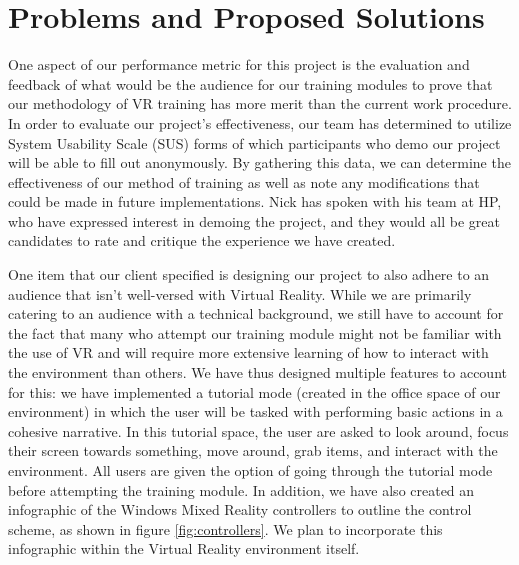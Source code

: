 \documentclass[onecolumn, draftclsnofoot,10pt, compsoc]{IEEEtran}
\begin{document}
\section{Problems and Proposed Solutions}
One aspect of our performance metric for this project is the evaluation and feedback of what would be the audience for our training modules to prove that our methodology of VR training has more merit than the current work procedure. In order to evaluate our project’s effectiveness, our team has determined to utilize System Usability Scale (SUS) forms of which participants who demo our project will be able to fill out anonymously. By gathering this data, we can determine the effectiveness of our method of training as well as note any modifications that could be made in future implementations. Nick has spoken with his team at HP, who have expressed interest in demoing the project, and they would all be great candidates to rate and critique the experience we have created. 


One item that our client specified is designing our project to also adhere to an audience that isn’t well-versed with Virtual Reality. While we are primarily catering to an audience with a technical background, we still have to account for the fact that many who attempt our training module might not be familiar with the use of VR and will require more extensive learning of how to interact with the environment than others. We have thus designed multiple features to account for this: we have implemented a tutorial mode (created in the office space of our environment) in which the user will be tasked with performing basic actions in a cohesive narrative. In this tutorial space, the user are asked to look around, focus their screen towards something, move around, grab items, and interact with the environment. All users are given the option of going through the tutorial mode before attempting the training module. In addition, we have also created an infographic of the Windows Mixed Reality controllers to outline the control scheme, as shown in figure \ref{fig:controllers}. We plan to incorporate this infographic within the Virtual Reality environment itself. 
\end{document}
